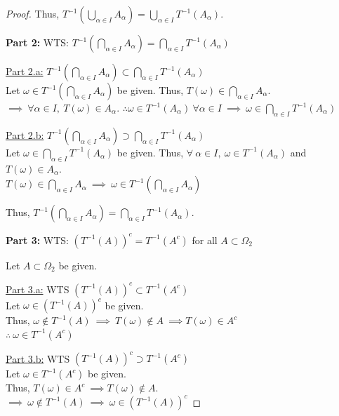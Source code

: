 \documentclass[12pt,letterpaper, onecolumn]{exam}
\newcommand{\Iintersect}{\bigcap_{\alpha \in I}}
\begin{document}
\begin{questions}
\begin{solution}
\begin{proof}
        Thus, $T^{-1}\left(\bigcup_{\alpha \in I} A_\alpha\right) = \bigcup_{\alpha \in I} T^{-1}(A_\alpha)$.

        \textbf{Part 2:} WTS: $T^{-1}\left(\bigcap_{\alpha \in I} A_\alpha\right) = \bigcap_{\alpha \in I} T^{-1}(A_\alpha)$

        \underline{Part 2.a:} $T^{-1}\left(\bigcap_{\alpha \in I} A_\alpha\right) \subset \bigcap_{\alpha \in I} T^{-1}(A_\alpha)$ \\
        Let $\omega \in T^{-1}(\Iintersect A_\alpha)$ be given. Thus, $T(\omega) \in \Iintersect A_\alpha$. \\
        $\implies \: \forall \alpha \in I, \: T(\omega) \in A_\alpha$. $\therefore \omega \in T^{-1}(A_\alpha) \: \forall \alpha \in I \: \implies \: \omega \in \Iintersect T^{-1}(A_\alpha)$
        
        \underline{Part 2.b:} $T^{-1}\left(\bigcap_{\alpha \in I} A_\alpha\right) \supset \bigcap_{\alpha \in I} T^{-1}(A_\alpha)$ \\
        Let $\omega \in \Iintersect T^{-1}(A_\alpha)$ be given. Thus, $\forall \: \alpha \in I, \: \omega \in T^{-1}(A_\alpha)$ and $T(\omega) \in A_\alpha$. \\
        $T(\omega) \in \Iintersect A_\alpha \: \implies \: \omega \in T^{-1}(\Iintersect A_\alpha)$

        Thus, $T^{-1}\left(\bigcap_{\alpha \in I} A_\alpha\right) = \bigcap_{\alpha \in I} T^{-1}(A_\alpha)$.

        \textbf{Part 3:} WTS: $(T^{-1}(A))^c = T^{-1}(A^c)$ for all $A \subset \Omega_2$

        Let $A \subset \Omega_2$ be given. 

        \underline{Part 3.a:} WTS $(T^{-1}(A))^c \subset T^{-1}(A^c)$ \\
        Let $\omega \in (T^{-1}(A))^c$ be given. \\
        Thus, $\omega \notin T^{-1}(A) \: \implies \: T(\omega) \notin A \: \implies T(\omega) \in A^c$\\
        $\therefore \: \omega \in T^{-1}(A^c)$

        \underline{Part 3.b:} WTS $(T^{-1}(A))^c \supset T^{-1}(A^c)$ \\
        Let $\omega \in T^{-1}(A^c)$ be given. \\ Thus, $T(\omega) \in A^c \: \implies T(\omega) \notin A$. \\
        $\implies \: \omega \notin T^{-1}(A) \: \implies \: \omega \in (T^{-1}(A))^c$


\end{proof}
\end{solution}
\end{questions}
\end{document}
